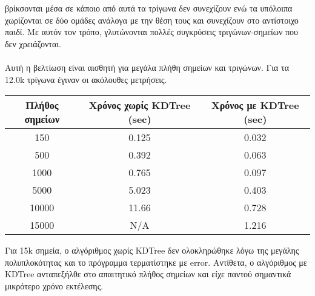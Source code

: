 \documentclass{report}
\begin{document}
βρίκσονται μέσα σε κάποιο από αυτά τα τρίγωνα δεν συνεχίζουν ενώ τα υπόλοιπα χωρίζονται σε δύο ομάδες ανάλογα με την θέση τους
και συνεχίζουν στο αντίστοιχο παιδί. Με αυτόν τον τρόπο, γλυτώνονται πολλές συγκρύσεις τριγώνων-σημείων που δεν χρειάζονται.
\\\\
Αυτή η βελτίωση είναι αισθητή για μεγάλα πλήθη σημείων και τριγώνων. Για τα 12.0k τρίγωνα έγιναν οι ακόλουθες μετρήσεις.
\begin{table}[H]
    \centering
    \begin{tabular}{c||c c}
        Πλήθος σημείων & Χρόνος χωρίς KDTree (sec) & Χρόνος με KDTree (sec) \\
        \hline
        150 & 0.125 & 0.032 \\
        500 & 0.392 & 0.063 \\
        1000 & 0.765 & 0.097 \\
        5000 & 5.023 & 0.403 \\
        10000 & 11.66 & 0.728 \\
        15000 & Ν/Α & 1.216 \\
    \end{tabular} 
\end{table}

Για 15k σημεία, ο αλγόριθμος χωρίς KDTree δεν ολοκληρώθηκε λόγω της μεγάλης πολυπλοκότητας και το πρόγραμμα τερματίστηκε με error.
Αντίθετα, ο αλγόριθμος με KDTree ανταπεξήλθε στο απαιτητικό πλήθος σημείων και είχε παντού σημαντικά μικρότερο χρόνο εκτέλεσης.


\clearpage
{}
\end{document}
